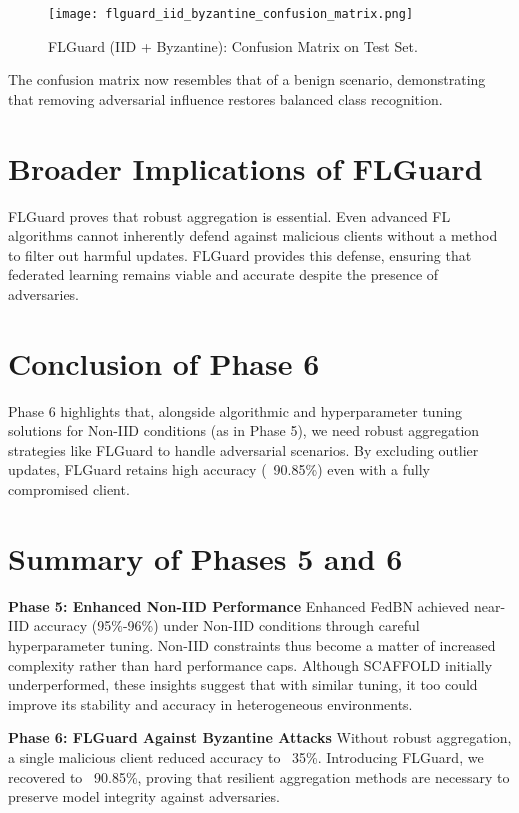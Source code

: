 \documentclass[12pt,a4paper]{report}
\begin{document}
\begin{figure}[H]
	\centering
	\texttt{[image: flguard\_iid\_byzantine\_confusion\_matrix.png]}
	\caption{FLGuard (IID + Byzantine): Confusion Matrix on Test Set.}
\end{figure}

The confusion matrix now resembles that of a benign scenario, demonstrating that removing adversarial influence restores balanced class recognition.

\section{Broader Implications of FLGuard}

FLGuard proves that robust aggregation is essential. Even advanced FL algorithms cannot inherently defend against malicious clients without a method to filter out harmful updates. FLGuard provides this defense, ensuring that federated learning remains viable and accurate despite the presence of adversaries.

\section{Conclusion of Phase 6}

Phase 6 highlights that, alongside algorithmic and hyperparameter tuning solutions for Non-IID conditions (as in Phase 5), we need robust aggregation strategies like FLGuard to handle adversarial scenarios. By excluding outlier updates, FLGuard retains high accuracy (~90.85\%) even with a fully compromised client.

\bigskip

\section*{Summary of Phases 5 and 6}

\textbf{Phase 5: Enhanced Non-IID Performance}  
Enhanced FedBN achieved near-IID accuracy (95\%-96\%) under Non-IID conditions through careful hyperparameter tuning. Non-IID constraints thus become a matter of increased complexity rather than hard performance caps. Although SCAFFOLD initially underperformed, these insights suggest that with similar tuning, it too could improve its stability and accuracy in heterogeneous environments.

\textbf{Phase 6: FLGuard Against Byzantine Attacks}  
Without robust aggregation, a single malicious client reduced accuracy to ~35\%. Introducing FLGuard, we recovered to ~90.85\%, proving that resilient aggregation methods are necessary to preserve model integrity against adversaries.
\end{document}
